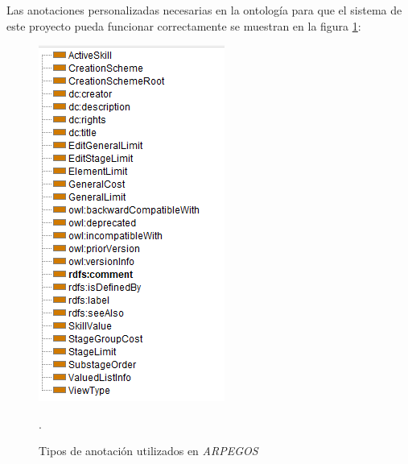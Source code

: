 Las anotaciones personalizadas necesarias en la ontología para que el sistema de este proyecto pueda 
funcionar correctamente se muestran en la figura \ref*{Custom_Annotation_Types}:

\begin{figure}[ht]
    \centering
    \includegraphics[scale=0.6]{Figures/Protege/Custom_Annotation_Types.png}
    \caption{Tipos de anotación utilizados en \textit{ARPEGOS}}.
    \label{Custom_Annotation_Types}
\end{figure}

